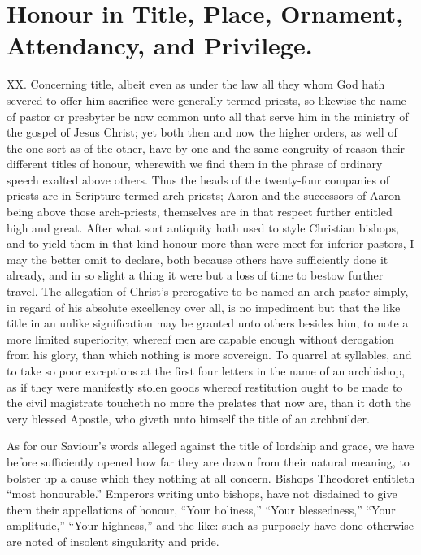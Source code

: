 \section*{Honour in Title, Place, Ornament, Attendancy, and Privilege.}

XX. Concerning title, albeit even as under the law all they whom God hath severed to offer him sacrifice were generally termed priests, so likewise the name of pastor or presbyter be now common unto all that serve him in the ministry of the gospel of Jesus Christ; yet both then and now the higher orders, as well of the one sort as of the other, have by one and the same congruity of reason their different titles of honour, wherewith we find them in the phrase of ordinary speech exalted above others. Thus the heads of the twenty-four companies of priests are in Scripture termed arch-priests; Aaron and the successors of Aaron being above those arch-priests, themselves are in that respect further entitled high and great. After what sort antiquity hath used to style Christian bishops, and to yield them in that kind honour more than were meet for inferior pastors, I may the better omit to declare, both because others have sufficiently done it already, and in so slight a thing it were but a loss of time to bestow further travel. The allegation of Christ’s prerogative to be named an arch-pastor simply, in regard of  his absolute excellency over all, is no impediment but that the like title in an unlike signification may be granted unto others besides him, to note a more limited superiority, whereof men are capable enough without derogation from his glory, than which nothing is more sovereign. To quarrel at syllables, and to take so poor exceptions at the first four letters in the name of an archbishop, as if they were manifestly stolen goods whereof restitution ought to be made to the civil magistrate toucheth no more the prelates that now are, than it doth the very blessed Apostle, who giveth unto himself the title of an archbuilder.

As for our Saviour’s words alleged against the title of lordship and grace, we have before sufficiently opened how far they are drawn from their natural meaning, to bolster up a cause which they nothing at all concern. Bishops Theodoret entitleth “most honourable.” Emperors writing unto bishops, have not disdained to give them their appellations of honour, “Your holiness,” “Your blessedness,” “Your amplitude,” “Your highness,” and the like: such as purposely have done otherwise are noted of insolent singularity and pride.

